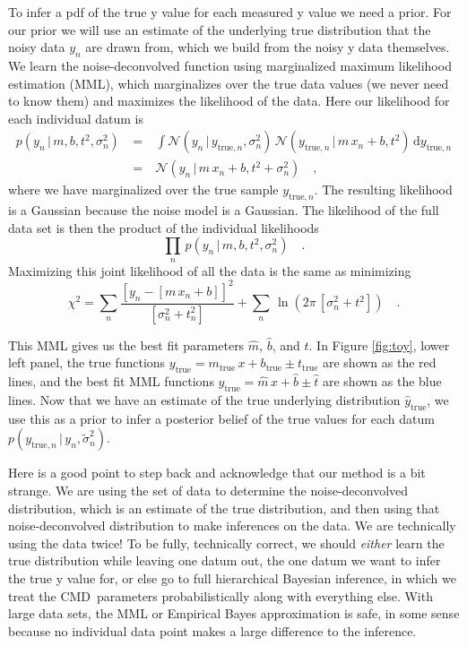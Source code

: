 \documentclass[modern]{aastex61}
\newcommand{\acronym}[1]{{\small{#1}}}
\newcommand{\cmd}{\acronym{CMD}}
\newcommand{\given}{\,|\,}
\newcommand{\true}{\mathrm{true}}
\begin{document}
To infer a pdf of the true y value for each measured y value we need a prior. For our prior we will use an estimate of the underlying true distribution that the noisy data $y_n$ are drawn from, which we build from the noisy y data themselves.
We learn the noise-deconvolved function using marginalized maximum likelihood estimation (MML), which marginalizes over the true data values (we never need to know them) and maximizes the likelihood of the data. Here our likelihood for each individual datum is
\begin{eqnarray}
p(y_n \given m, b, t^2, \sigma_n^2) \ &=& \ \int \mathcal{N}(y_n \given y_{\true,n}, \sigma_n^2) \, \mathcal{N}(y_{\true,n} \given m\,x_n + b, t^2 ) \, \mathrm{d}y_{\true, n} \\
&=&  \ \mathcal{N}(y_n \given m\,x_n + b, t^2 + \sigma_n^2) \quad,
\label{eq:toyLike}
\end{eqnarray}
where we have marginalized over the true sample $y_{\true, n}$. The resulting likelihood is a Gaussian because the noise model is a Gaussian. The likelihood of the full data set is then the product of the individual likelihoods
\begin{equation}
\prod_n\, p(y_n \given m, b, t^2, \sigma_n^2) \quad .
\label{eq:toyLikeFull}
\end{equation}
Maximizing this joint likelihood of all the data is the same as minimizing
\begin{equation}
\chi^2 = \sum_n \frac{[y_n - [m\,x_n + b]]^2}{[\sigma_n^2 + t_n^2]} + \sum_n\,\ln(2\pi\,[\sigma_n^2 + t^2])
\quad .
\label{eq:chisq}
\end{equation}

This MML gives us the best fit parameters $\hat{m}$, $\hat{b}$, and $\hat{t}$. In Figure \ref{fig:toy}, lower left panel, the true functions $y_{\true} = m_{\true}\,x + b_{\true} \pm t_{\true}$ are shown as the red lines, and the best fit MML functions $\hat{y}_{\true} = \hat{m}\, x + \hat{b} \pm \hat{t}$ are shown as the blue lines. Now that we have an estimate of the true underlying distribution $\hat{y}_{\true}$, we use this as a prior to infer a posterior belief of the true values for each datum $p(y_{\true,n} \given y_n, \tilde{\sigma}_n^2)$.

Here is a good point to step back and acknowledge that our method is a
bit strange. We are using the set of data to determine the
noise-deconvolved distribution, which is an estimate of the true
distribution, and then using that noise-deconvolved distribution to
make inferences on the data. We are technically using the data
twice! To be fully, technically correct, we should \emph{either} learn the true
distribution while leaving one datum out, the one datum we want to
infer the true y value for, or else go to full hierarchical Bayesian inference,
in which we treat the \cmd\ parameters probabilistically along with everything else.
With large data sets, the MML or Empirical Bayes approximation is safe,
in some sense because no individual data point makes a large difference to
the inference.
\end{document}
